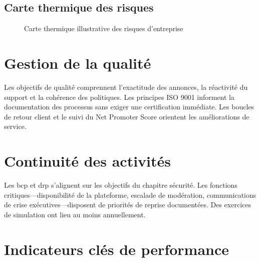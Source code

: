 \subsection{Carte thermique des risques}

\begin{figure}[H]
  \centering
  \caption{Carte thermique illustrative des risques d'entreprise}
  \label{fig:risk-heatmap}
\end{figure}

\section{Gestion de la qualité}

Les objectifs de qualité comprennent l'exactitude des annonces, la réactivité du support et la cohérence des politiques. Les principes ISO 9001 informent la documentation des processus sans exiger une certification immédiate. Les boucles de retour client et le suivi du Net Promoter Score orientent les améliorations de service.

\section{Continuité des activités}

Les \gls{bcp} et \gls{drp} s'alignent sur les objectifs du chapitre sécurité. Les fonctions critiques---disponibilité de la plateforme, escalade de modération, communications de crise exécutives---disposent de priorités de reprise documentées. Des exercices de simulation ont lieu au moins annuellement.

\section{Indicateurs clés de performance}

